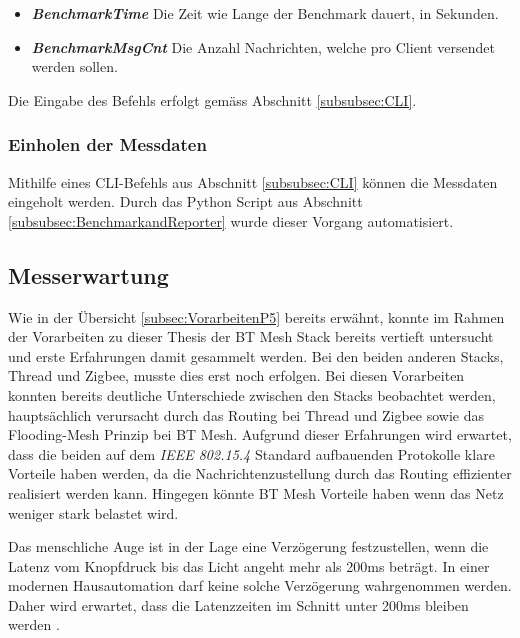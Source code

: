 \begin{itemize}
	\item \textit{\textbf{BenchmarkTime}} Die Zeit wie Lange der Benchmark dauert, in Sekunden. 
	\item \textit{\textbf{BenchmarkMsgCnt}} Die Anzahl Nachrichten, welche pro Client versendet werden sollen. 
\end{itemize}

Die Eingabe des Befehls erfolgt gemäss Abschnitt \ref{subsubsec:CLI}. 


\subsubsection{Einholen der Messdaten}\label{subsec:GetNodeReports}
Mithilfe eines CLI-Befehls aus Abschnitt \ref{subsubsec:CLI} können die Messdaten eingeholt werden. Durch das Python Script aus Abschnitt \ref{subsubsec:BenchmarkandReporter} wurde dieser Vorgang automatisiert. 


\subsection{Messerwartung}\label{subsec:Messerwartung}
Wie in der Übersicht \ref{subsec:VorarbeitenP5} bereits erwähnt, konnte im Rahmen der Vorarbeiten zu dieser Thesis der BT Mesh Stack bereits vertieft untersucht und erste Erfahrungen damit gesammelt werden. Bei den beiden anderen Stacks, Thread und Zigbee, musste dies erst noch erfolgen.
Bei diesen Vorarbeiten konnten bereits deutliche Unterschiede zwischen den Stacks beobachtet werden, hauptsächlich verursacht durch das Routing bei Thread und Zigbee sowie das Flooding-Mesh Prinzip bei BT Mesh.
Aufgrund dieser Erfahrungen wird erwartet, dass die beiden auf dem \textit{IEEE 802.15.4} Standard aufbauenden Protokolle klare Vorteile haben werden, da die Nachrichtenzustellung durch das Routing effizienter realisiert werden kann.
Hingegen könnte BT Mesh Vorteile haben wenn das Netz weniger stark belastet wird.

Das menschliche Auge ist in der Lage eine Verzögerung festzustellen, wenn die Latenz vom Knopfdruck bis das Licht angeht mehr als 200ms beträgt.
In einer modernen Hausautomation darf keine solche Verzögerung wahrgenommen werden. Daher wird erwartet, dass die Latenzzeiten im Schnitt unter 200ms bleiben werden \cite{silicon_laboratories_inc_an1142_2020}.


